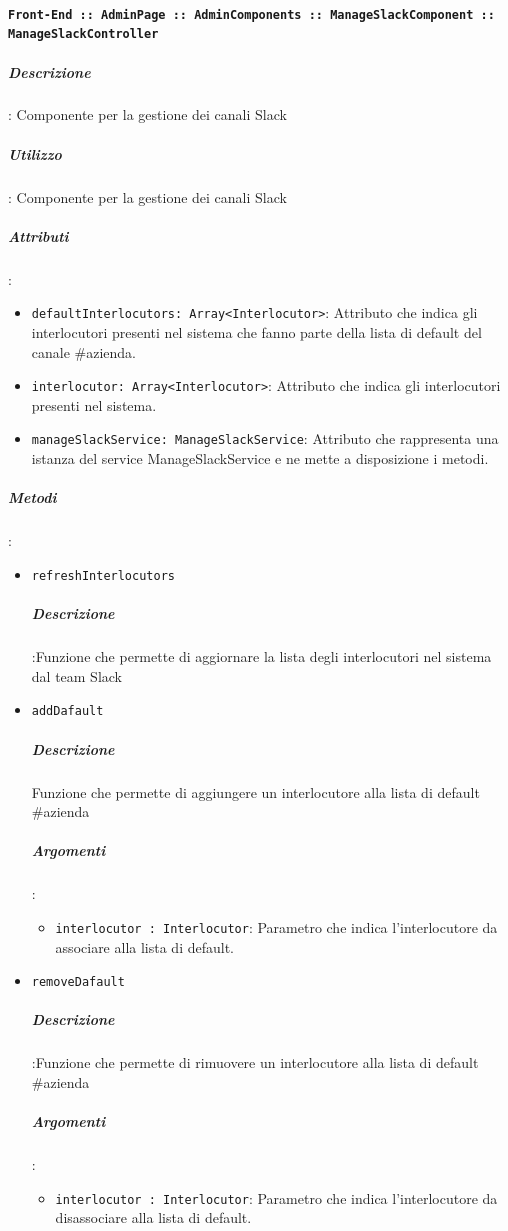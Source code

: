 \documentclass[../DefinizioneDiProdotto_v3.0.0.tex]{subfiles}
\begin{document}
			      \paragraph{\texttt{Front-End :: AdminPage :: AdminComponents :: ManageSlackComponent :: ManageSlackController}}
			      	\subparagraph{Descrizione}: Componente per la gestione dei canali Slack
			      	\subparagraph{Utilizzo}: Componente per la gestione dei canali Slack
			      	\subparagraph{Attributi}:
					\begin{itemize}
						\item \texttt{defaultInterlocutors: Array<Interlocutor>}: Attributo che indica gli interlocutori presenti nel sistema che fanno parte della lista di default del canale \#azienda.
						\item \texttt{interlocutor: Array<Interlocutor>}: Attributo che indica gli interlocutori presenti nel sistema.
						\item \texttt{manageSlackService: ManageSlackService}: Attributo che rappresenta una istanza del service ManageSlackService e ne mette a disposizione i metodi.
					\end{itemize}
	      			\subparagraph{Metodi}:
					\begin{itemize}
						\item \texttt{refreshInterlocutors}
						\subparagraph{Descrizione}:Funzione che permette di aggiornare la lista degli interlocutori nel sistema dal team Slack

						\item \texttt{addDafault}
						\subparagraph{Descrizione}Funzione che permette di aggiungere un interlocutore alla lista di default \#azienda
						\subparagraph{Argomenti}:
						\begin{itemize}
							\item \texttt{interlocutor : Interlocutor}: Parametro che indica l'interlocutore da associare alla lista di default.
						\end{itemize}

						\item \texttt{removeDafault}
						\subparagraph{Descrizione}:Funzione che permette di rimuovere un interlocutore alla lista di default \#azienda
						\subparagraph{Argomenti}:
						\begin{itemize}
							\item \texttt{interlocutor : Interlocutor}: Parametro che indica l'interlocutore da disassociare alla lista di default.
						\end{itemize}
					\end{itemize}
\end{document}
